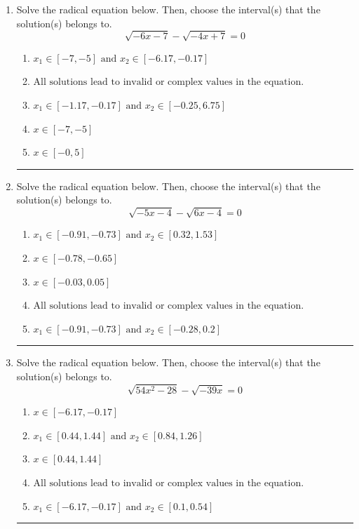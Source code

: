 \documentclass[14pt]{extbook}
\newcommand{\litem}[1]{\item#1\hspace*{-1cm}\rule{\textwidth}{0.4pt}}
\begin{document}
\begin{enumerate}
{\begin{enumerate}[label=\Alph*.]
\end{enumerate} }
\litem{
Solve the radical equation below. Then, choose the interval(s) that the solution(s) belongs to.\[ \sqrt{-6 x - 7} - \sqrt{-4 x + 7} = 0 \]\begin{enumerate}[label=\Alph*.]
\item \( x_1 \in [-7, -5] \text{ and } x_2 \in [-6.17,-0.17] \)
\item \( \text{All solutions lead to invalid or complex values in the equation.} \)
\item \( x_1 \in [-1.17, -0.17] \text{ and } x_2 \in [-0.25,6.75] \)
\item \( x \in [-7,-5] \)
\item \( x \in [-0,5] \)

\end{enumerate} }
\litem{
Solve the radical equation below. Then, choose the interval(s) that the solution(s) belongs to.\[ \sqrt{-5 x - 4} - \sqrt{6 x - 4} = 0 \]\begin{enumerate}[label=\Alph*.]
\item \( x_1 \in [-0.91, -0.73] \text{ and } x_2 \in [0.32,1.53] \)
\item \( x \in [-0.78,-0.65] \)
\item \( x \in [-0.03,0.05] \)
\item \( \text{All solutions lead to invalid or complex values in the equation.} \)
\item \( x_1 \in [-0.91, -0.73] \text{ and } x_2 \in [-0.28,0.2] \)

\end{enumerate} }
\litem{
Solve the radical equation below. Then, choose the interval(s) that the solution(s) belongs to.\[ \sqrt{54 x^2 - 28} - \sqrt{-39 x} = 0 \]\begin{enumerate}[label=\Alph*.]
\item \( x \in [-6.17,-0.17] \)
\item \( x_1 \in [0.44, 1.44] \text{ and } x_2 \in [0.84,1.26] \)
\item \( x \in [0.44,1.44] \)
\item \( \text{All solutions lead to invalid or complex values in the equation.} \)
\item \( x_1 \in [-6.17, -0.17] \text{ and } x_2 \in [0.1,0.54] \)

\end{enumerate} }
\end{enumerate}
\end{document}
